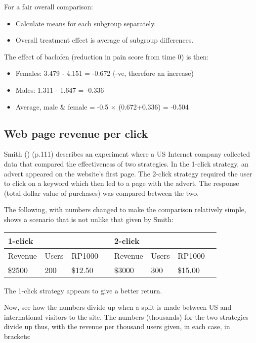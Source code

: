 \documentclass[
  10ptls,
  b5paper]{book}
\providecommand{\tightlist}{%
  \setlength{\itemsep}{0pt}\setlength{\parskip}{0pt}}
\begin{document}
For a fair overall comparison:

\begin{itemize}
\tightlist
\item
  Calculate means for each subgroup separately.
\item
  Overall treatment effect is average of subgroup differences.
\end{itemize}

The effect of baclofen (reduction in pain score from time 0) is then:

\begin{itemize}
\tightlist
\item
  Females: 3.479 - 4.151 = -0.672 (-ve, therefore an increase)
\item
  Males: 1.311 - 1.647 = -0.336
\item
  Average, male \& female = -0.5 \(\times\) (0.672+0.336) = -0.504
\end{itemize}

\subsection*{Web page revenue per click}\label{web-page-revenue-per-click}

Smith () (p.111) describes an experiment where a US Internet company collected data that compared the effectiveness of two strategies. In the 1-click strategy, an advert appeared on the website's first page. The 2-click strategy required the user to click on a keyword which then led to a page with the advert. The response (total dollar value of purchases) was compared between the two.

The following, with numbers changed to make the comparison relatively simple, shows a scenario that is not unlike that given by Smith:

\begin{longtable}[]{@{}llllllll@{}}
\toprule\noalign{}
1-click & & & & 2-click & & & \\
\midrule\noalign{}
\endhead
\bottomrule\noalign{}
\endlastfoot
Revenue & Users & RP1000 & & Revenue & Users & RP1000 & \\
\$2500 & 200 & \$12.50 & & \$3000 & 300 & \$15.00 & \\
\end{longtable}

The 1-click strategy appears to give a better return.

Now, see how the numbers divide up when a split is made between US and international visitors to the site. The numbers (thousands) for the two strategies divide up thus, with the revenue per thousand users given, in each case, in brackets:
\end{document}
